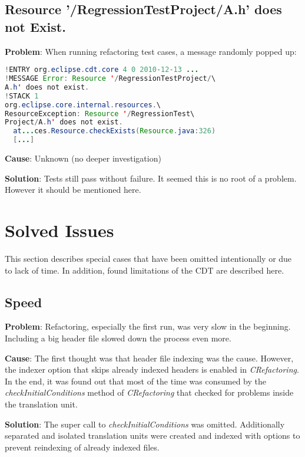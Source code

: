 \subsection{Resource '/RegressionTestProject/A.h' does not Exist.}

\textbf{Problem}: When running refactoring test cases, a message randomly
popped up:

\begin{lstlisting}[caption={Randomly appearing error message},language=java]
!ENTRY org.eclipse.cdt.core 4 0 2010-12-13 ...
!MESSAGE Error: Resource '/RegressionTestProject/\
A.h' does not exist.
!STACK 1
org.eclipse.core.internal.resources.\
ResourceException: Resource '/RegressionTest\
Project/A.h' does not exist.
  at...ces.Resource.checkExists(Resource.java:326)
  [...]
\end{lstlisting}

\textbf{Cause}: Unknown (no deeper investigation)

\textbf{Solution}: Tests still pass without failure. It seemed this is no root
of a problem. However it should be mentioned here.

\section{Solved Issues}

This section describes special cases that have been omitted intentionally or due 
to lack of time. In addition, found limitations of the CDT are described here.

\subsection{Speed}
\textbf{Problem}: Refactoring, especially the first run, was very slow in the 
beginning. Including a big header file slowed down the process even more.

\textbf{Cause}: The first thought was that header file indexing was the cause. 
However, the indexer option that skips already indexed headers is enabled in 
\textit{CRefactoring}. In the end, it was found out that most of the time was 
consumed by the \textit{checkInitialConditions} method of \textit{CRefactoring} 
that checked for problems inside the translation unit.

\textbf{Solution}: The super call to \textit{checkInitialConditions} was
omitted. Additionally separated and isolated translation units were created and
indexed with options to prevent reindexing of already indexed files.

